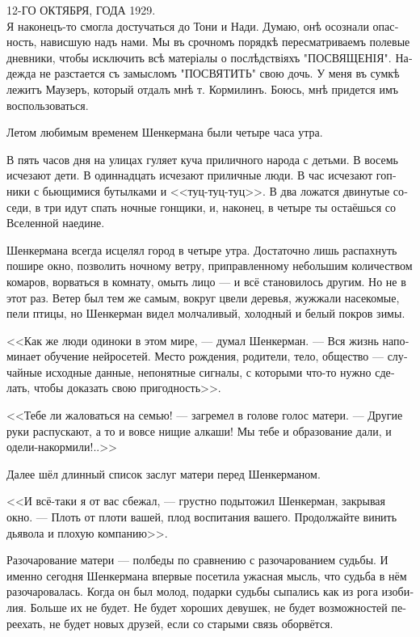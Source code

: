 \documentclass[a5paper,12pt,fleqn]{extbook}\usepackage{cooltooltips}\usepackage{polyglossia}\setdefaultlanguage[babelshorthands=true]{russian}\setotherlanguage{english}\defaultfontfeatures{Ligatures=TeX,Mapping=tex-text} \usepackage{xcolor}\definecolor{lightgray}{HTML}{bbbbbb}\color{lightgray}\newcommand{\ml}[3]{\textenglish{\textcolor{black}{#3}}}
\newcommand{\asterism}{\vspace{1em}{\centering\Large\bfseries$\ast~\ast~\ast$\par}\vspace{1em}}
\newcommand{\oldtyping}[1]{{\hspace{0.1em}\oldfont\small{#1}\par}\hspace{0.1em}}
\begin{document}
\oldtyping{
12-ГО ОКТЯБРЯ, ГОДА 1929.\\
Я наконецъ-то смогла достучаться до Тони и Нади.
Думаю, онѣ осознали опасность, нависшую надъ нами.
Мы въ срочномъ порядкѣ пересматриваемъ полевые дневники, чтобы исключить всѣ матеріалы о послѣдствіяхъ "ПОСВЯЩЕНІЯ".
Надежда не разстается съ замысломъ "ПОСВЯТИТЬ" свою дочь.
У меня въ сумкѣ лежитъ Маузеръ, который отдалъ мнѣ т. Кормилинъ.
Боюсь, мнѣ придется имъ воспользоваться.
}

\asterism

Летом любимым временем Шенкермана были четыре часа утра.

В пять часов дня на улицах гуляет куча приличного народа с детьми.
В восемь исчезают дети.
В одиннадцать исчезают приличные люди.
В час исчезают гопники с бьющимися бутылками и <<туц-туц-туц>>.
В два ложатся двинутые соседи, в три идут спать ночные гонщики, и, наконец, в четыре ты остаёшься со Вселенной наедине.

Шенкермана всегда исцелял город в четыре утра.
Достаточно лишь распахнуть пошире окно, позволить ночному ветру, приправленному небольшим количеством комаров, ворваться в комнату, омыть лицо --- и всё становилось другим.
Но не в этот раз.
Ветер был тем же самым, вокруг цвели деревья, жужжали насекомые, пели птицы, но Шенкерман видел молчаливый, холодный и белый покров зимы.

<<Как же люди одиноки в этом мире, --- думал Шенкерман.
--- Вся жизнь напоминает обучение нейросетей.
Место рождения, родители, тело, общество --- случайные исходные данные, непонятные сигналы, с которыми что-то нужно сделать, чтобы доказать свою пригодность>>.

<<Тебе ли жаловаться на семью! --- загремел в голове голос матери.
--- Другие руки распускают, а то и вовсе нищие алкаши!
Мы тебе и образование дали, и одели-накормили!..>>

Далее шёл длинный список заслуг матери перед Шенкерманом.

<<И всё-таки я от вас сбежал, --- грустно подытожил Шенкерман, закрывая окно.
--- Плоть от плоти вашей, плод воспитания вашего.
Продолжайте винить дьявола и плохую компанию>>.

Разочарование матери --- полбеды по сравнению с разочарованием судьбы.
И именно сегодня Шенкермана впервые посетила ужасная мысль, что судьба в нём разочаровалась.
Когда он был молод, подарки судьбы сыпались как из рога изобилия.
Больше их не будет.
Не будет хороших девушек, не будет возможностей переехать, не будет новых друзей, если со старыми связь оборвётся.
\end{document}

